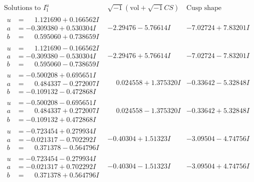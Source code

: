 \documentclass[1p]{elsarticle_modified}
\theoremstyle{definition}
\newcommand{\I}{\sqrt{-1}}
\begin{document}
$$\begin{array}{c|c|c}  
\text{Solutions to }I^u_{1}& \I (\text{vol} + \sqrt{-1}CS) & \text{Cusp shape}\\
 \hline 
\begin{aligned}
u &= \phantom{-}1.121690 + 0.166562 I \\
a &= -0.309380 + 0.530304 I \\
b &= \phantom{-}0.595060 + 0.738659 I\end{aligned}
 & -2.29476 - 5.76614 I & -7.02724 + 7.83201 I \\ \hline\begin{aligned}
u &= \phantom{-}1.121690 - 0.166562 I \\
a &= -0.309380 - 0.530304 I \\
b &= \phantom{-}0.595060 - 0.738659 I\end{aligned}
 & -2.29476 + 5.76614 I & -7.02724 - 7.83201 I \\ \hline\begin{aligned}
u &= -0.500208 + 0.695651 I \\
a &= \phantom{-}0.484337 - 0.272007 I \\
b &= -0.109132 - 0.472868 I\end{aligned}
 & \phantom{-}0.024558 + 1.375320 I & -0.33642 - 5.32848 I \\ \hline\begin{aligned}
u &= -0.500208 - 0.695651 I \\
a &= \phantom{-}0.484337 + 0.272007 I \\
b &= -0.109132 + 0.472868 I\end{aligned}
 & \phantom{-}0.024558 - 1.375320 I & -0.33642 + 5.32848 I \\ \hline\begin{aligned}
u &= -0.723454 + 0.279934 I \\
a &= -0.021317 - 0.702292 I \\
b &= \phantom{-}0.371378 - 0.564796 I\end{aligned}
 & -0.40304 + 1.51323 I & -3.09504 - 4.74756 I \\ \hline\begin{aligned}
u &= -0.723454 - 0.279934 I \\
a &= -0.021317 + 0.702292 I \\
b &= \phantom{-}0.371378 + 0.564796 I\end{aligned}
 & -0.40304 - 1.51323 I & -3.09504 + 4.74756 I \\ \hline\begin{aligned}

\end{aligned}
\end{array}$$
\end{document}
